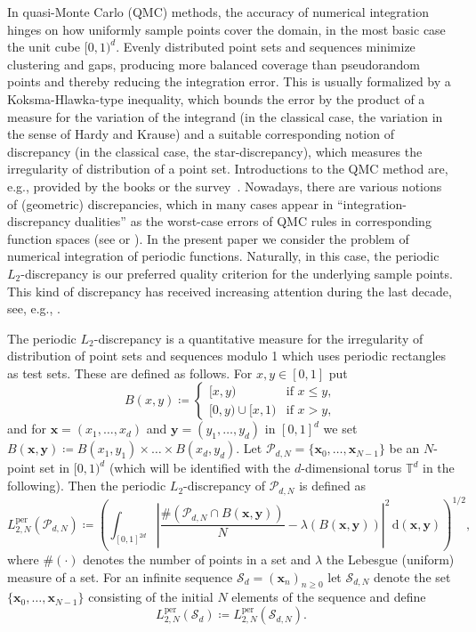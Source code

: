 \documentclass[12pt, a4paper]{article}
\def\P{\mathcal{P}}
\def\S{\mathcal{S}}
\newcommand{\bsx}{{\boldsymbol{x}}}
\newcommand{\bsy}{{\boldsymbol{y}}}
\newcommand{\rd}{\,\mathrm{d}} %
\begin{document}
In quasi-Monte Carlo (QMC) methods, the accuracy of numerical integration hinges on how uniformly sample points cover the domain, in the most basic case the unit cube $[0,1)^d$. Evenly distributed point sets and sequences minimize clustering and gaps, producing more balanced coverage than pseudorandom points and thereby reducing the integration error. This is usually formalized by a Koksma-Hlawka-type inequality, which bounds the error by the product of a measure for the variation of the integrand (in the classical case, the variation in the sense of Hardy and Krause) and a suitable corresponding notion of discrepancy (in the classical case, the star-discrepancy), which measures the irregularity of distribution of a point set. Introductions to the QMC method are, e.g., provided by the books \cite{DT97,DKP22,DP10,LP14,N92} or the survey~\cite{DKS}. Nowadays, there are various notions of (geometric) discrepancies, which in many cases appear in ``integration-discrepancy dualities'' as the worst-case errors of QMC rules in corresponding function spaces (see \cite[Chapter~9]{NW10} or \cite[Section~4]{NP26}). In the present paper we consider the problem of numerical integration of periodic functions. Naturally, in this case, the periodic $L_2$-discrepancy is our preferred quality criterion for the underlying sample points. This kind of discrepancy has received increasing attention during the last decade, see, e.g., \cite{HKP20,HOe,HW12,KP22b,Lev,Na,NP26,P23}.

The periodic $L_2$-discrepancy is a quantitative measure for the irregularity of distribution of point sets and sequences modulo 1 which uses periodic rectangles as test sets. These are defined as follows. For $x,y\in [0,1]$ put
$$B(x,y)\coloneqq\begin{cases}
           [x,y) & \text{if $x\leq y$}, \\
           [0,y)\cup [x,1)& \text{if $x>y$,}
          \end{cases}$$
and for $\bsx=(x_1,\dots,x_d)$ and $\bsy=(y_1,\dots,y_d)$ in $[0,1]^d$ we set $B(\bsx,\bsy)\coloneqq B(x_1,y_1)\times \dots \times B(x_d,y_d)$. Let $\P_{d,N}=\{\bsx_0,\dots,\bsx_{N-1}\}$ be an $N$-point set in $[0,1)^d$ (which will be identified with the $d$-dimensional torus $\mathbb{T}^d$ in the following). Then the periodic $L_2$-discrepancy of $\P_{d,N}$ is defined as
$$ L_{2,N}^{\mathrm{per}}(\P_{d,N})\coloneqq \left(\int_{[0,1]^{2d}}\left|\frac{\#(\P_{d,N} \cap B(\bsx,\bsy))}{N}-\lambda(B(\bsx,\bsy))\right|^2\rd (\bsx,\bsy)\right)^{1/2},$$
where $\#(\cdot)$ denotes the number of points in a set and $\lambda$ the Lebesgue (uniform) measure of a set. For an infinite sequence $\S_d=(\bsx_n)_{n \ge 0}$ let $\S_{d,N}$ denote the set $\{\bsx_0,\ldots,\bsx_{N-1}\}$ consisting of the initial $N$ elements of the sequence and define $$L_{2,N}^{\mathrm{per}}(\S_d)\coloneqq  L_{2,N}^{\mathrm{per}}(\S_{d,N}).$$
\end{document}
